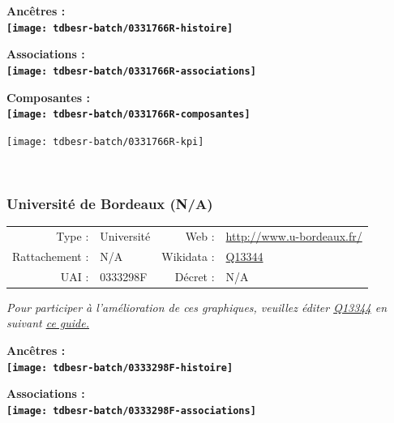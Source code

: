\documentclass[12pt,french,]{article}
\begin{document}
\vspace{1cm}  
\begin{minipage}[b]{0.50\textwidth}\begin{center} \bf Ancêtres : \\  
\texttt{[image: tdbesr-batch/0331766R-histoire]} \end{center}\end{minipage}\begin{minipage}[b]{0.50\textwidth}\begin{center} \bf Associations : \\  
\texttt{[image: tdbesr-batch/0331766R-associations]} \end{center}\end{minipage}

\hrulefill

\begin{center} \bf Composantes : \\  
\texttt{[image: tdbesr-batch/0331766R-composantes]} \end{center}

\begin{center}\texttt{[image: tdbesr-batch/0331766R-kpi]} \end{center}\checkoddpage

\ifoddpage \fi ~\newpage  

\hypertarget{universituxe9-de-bordeaux-na}{%
\subsubsection{Université de Bordeaux
(N/A)}\label{universituxe9-de-bordeaux-na}}

\begin{tabular*}{\textwidth}{rp{5cm}rl}  
\hline  
Type : & Université & Web : &\href{http://www.u-bordeaux.fr/}{http://www.u-bordeaux.fr/} \\  
Rattachement : & N/A & Wikidata : & \href{https://www.wikidata.org/entity/Q13344}{Q13344} \\  
UAI : & 0333298F & Décret : & N/A \\  
\hline  
\end{tabular*}

\textit{\scriptsize Pour participer à l'amélioration de ces graphiques, veuillez éditer  \href{https://www.wikidata.org/entity/Q13344}{Q13344}  en suivant \href{https://github.com/cpesr/wikidataESR/blob/master/Rmd/wikidataESR.md}{ce guide.}}

\vspace{1cm}  
\begin{minipage}[b]{0.50\textwidth}\begin{center} \bf Ancêtres : \\  
\texttt{[image: tdbesr-batch/0333298F-histoire]} \end{center}\end{minipage}\begin{minipage}[b]{0.50\textwidth}\begin{center} \bf Associations : \\  
\texttt{[image: tdbesr-batch/0333298F-associations]} \end{center}\end{minipage}
\end{document}
